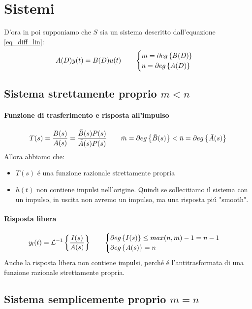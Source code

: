 \documentclass[../main.tex]{subfiles}
\begin{document}
	\section{Sistemi}
		D'ora in poi supponiamo che $ S $ sia un sistema descritto dall'equazione \ref{eq_diff_lin}:
		\[ 
			A(D) y(t) = B(D) u(t) \qquad 
			\begin{cases}
				m = \partial eg \left\lbrace B(D) \right\rbrace
				\\
				n=\partial eg \left\lbrace A(D) \right\rbrace
			\end{cases}
		\]
	
	\subsection{Sistema strettamente proprio $ m < n $}
		\paragraph{Funzione di trasferimento e risposta all'impulso}
			\[
				T(s) = \frac{B(s)}{A(s)} = \frac{\bar{B}(s) P(s)}{\bar{A}(s) P(s)} \qquad \bar{m} = \partial eg \left\lbrace \bar{B}(s) \right\rbrace < \bar{n} = \partial eg \left\lbrace \bar{A}(s) \right\rbrace
			\]
			Allora abbiamo che:
			\begin{itemize}
				\item
					$ T(s) $ \'{e} una funzione razionale strettamente propria
				\item
					$ h(t) $ non contiene impulsi nell'origine. Quindi se sollecitiamo il sistema con un impulso, in uscita non avremo un impulso, ma una risposta pi\'{u} "smooth".
			\end{itemize}
		\paragraph{Risposta libera}
			\[
				y_l(t) = \mathcal{L}^{-1} \left\lbrace \frac{I(s)}{A(s)} \right\rbrace \qquad 
				\begin{cases} 
					\partial eg \left\lbrace I(s) \right\rbrace \leq max(n,m) - 1 = n-1
					\\
					\partial eg \left\lbrace A(s) \right\rbrace = n 
				\end{cases} 
			\]
			Anche la risposta libera non contiene impulsi, perch\'e \'e l'antitrasformata di una funzione razionale strettamente propria.
	
	\subsection{Sistema semplicemente proprio $ m = n $}
\end{document}
